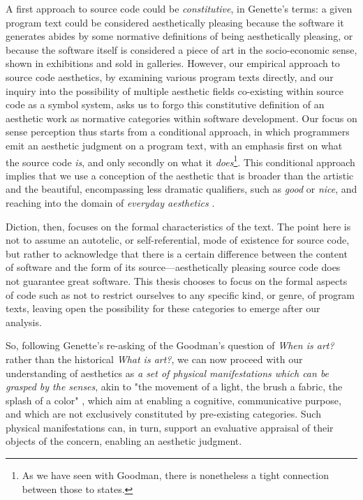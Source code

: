 A first approach to source code could be \emph{constitutive}, in Genette's terms: a given program text could be considered aesthetically pleasing because the software it generates abides by some normative definitions of being aesthetically pleasing, or because the software itself is considered a piece of art in the socio-economic sense, shown in exhibitions and sold in galleries. However, our empirical approach to source code aesthetics, by examining various program texts directly, and our inquiry into the possibility of multiple aesthetic fields co-existing within source code as a symbol system, asks us to forgo this constitutive definition of an aesthetic work as normative categories within software development. Our focus on sense perception thus starts from a conditional approach, in which programmers emit an aesthetic judgment on a program text, with an emphasis first on what the source code \emph{is}, and only secondly on what it \emph{does}\footnote{As we have seen with Goodman, there is nonetheless a tight connection between those to states.}. This conditional approach implies that we use a conception of the aesthetic that is broader than the artistic and the beautiful, encompassing less dramatic qualifiers, such as \emph{good} or \emph{nice}, and reaching into the domain of \emph{everyday aesthetics} \citep{saito_everyday_2012}.

Diction, then, focuses on the formal characteristics of the text. The point here is not to assume an autotelic, or self-referential, mode of existence for source code, but rather to acknowledge that there is a certain difference between the content of software and the form of its source—aesthetically pleasing source code does not guarantee great software. This thesis chooses to focus on the formal aspects of code such as not to restrict ourselves to any specific kind, or genre, of program texts, leaving open the possibility for these categories to emerge after our analysis.

So, following Genette's re-asking of the Goodman's question of \emph{When is art?} rather than the historical \emph{What is art?}, we can now proceed with our understanding of aesthetics as \emph{a set of physical manifestations which can be grasped by the senses}, akin to "the movement of a light, the brush a fabric, the splash of a color" \citep{ranciere_aisthesis_2013}, which aim at enabling a cognitive, communicative purpose, and which are not exclusively constituted by pre-existing categories. Such physical manifestations can, in turn, support an evaluative appraisal of their objects of the concern, enabling an aesthetic judgment.


